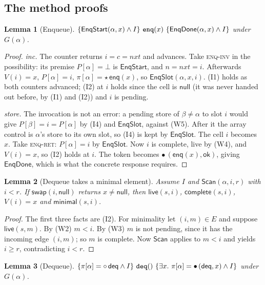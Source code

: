\documentclass[11pt]{article}
\newtheorem{lemma}{Lemma}[section]
\theoremstyle{definition}
\theoremstyle{remark}
\newcommand{\Enq}{\mathsf{enq}}
\newcommand{\Deq}{\mathsf{deq}}
\newcommand{\Swap}{\mathsf{swap}}
\newcommand{\ok}{\mathsf{ok}}
\newcommand{\nul}{\mathsf{null}}
\newcommand{\live}{\mathsf{live}}
\newcommand{\complete}{\mathsf{complete}}
\newcommand{\minimal}{\mathsf{minimal}}
\newcommand{\Scan}{\mathsf{Scan}}
\newcommand{\tokens}{\pi}
\newcommand{\code}[1]{\texttt{\detokenize{#1}}}
\newcommand{\tok}[1]{\circ\,#1}
\newcommand{\done}[2]{\bullet\,(#1,#2)}
\newcommand{\lini}[1]{\star\,#1}
\newcommand{\ms}[1]{\mathsf{#1}}
\begin{document}
\subsection{The method proofs}

\begin{lemma}[Enqueue]\label{lem:enq}
$\{\ms{EnqStart}(\alpha, x) \wedge I\}\ \code{enq}(x)\ \{\ms{EnqDone}(\alpha, x) \wedge I\}$
under $G(\alpha)$.
\end{lemma}

\begin{proof}
\emph{inc.}  The counter returns $i = c = \mathit{nxt}$ and advances.  Take
\textsc{enq-inv} in the possibility: its premise $P[\alpha] = \bot$ is
$\ms{EnqStart}$, and $n = \mathit{nxt} = i$.  Afterwards $V(i) = x$,
$P[\alpha] = i$, $\tokens[\alpha] = \lini{\Enq(x)}$, so $\ms{EnqSlot}(\alpha,
x, i)$.  (I1) holds as both counters advanced; (I2) at $i$ holds since the
cell is $\nul$ (it was never handed out before, by (I1) and (I2)) and $i$ is
pending.

\emph{store.}  The invocation is not an error: a pending store of
$\beta \ne \alpha$ to slot $i$ would give $P[\beta] = i = P[\alpha]$ by
(I4) and $\ms{EnqSlot}$, against (W5).  After it the array control is
$\alpha$'s store to its own slot, so (I4) is kept by $\ms{EnqSlot}$.  The
cell $i$ becomes $x$.  Take \textsc{enq-ret}: $P[\alpha]
= i$ by $\ms{EnqSlot}$.  Now $i$ is complete, live by (W4), and $V(i) = x$,
so (I2) holds at $i$.  The token becomes $\done{\Enq(x)}{\ok}$, giving
$\ms{EnqDone}$, which is what the concrete response requires.
\end{proof}

\begin{lemma}[Dequeue takes a minimal element]\label{lem:minimal}
Assume $I$ and $\Scan(\alpha, i, r)$ with $i < r$.  If $\Swap(i, \nul)$
returns $x \ne \nul$, then $\live(s, i)$, $\complete(s, i)$, $V(i) = x$ and
$\minimal(s, i)$.
\end{lemma}

\begin{proof}
The first three facts are (I2).  For minimality let $(i, m) \in E$ and
suppose $\live(s, m)$.  By (W2) $m < i$.  By (W3) $m$ is not pending, since it
has the incoming edge $(i, m)$; so $m$ is complete.  Now $\Scan$ applies to
$m < i$ and yields $i \ge r$, contradicting $i < r$.
\end{proof}

\begin{lemma}[Dequeue]\label{lem:deq}
$\{\tokens[\alpha] = \tok{\Deq} \wedge I\}\ \code{deq}()\
\{\exists x.\ \tokens[\alpha] = \done{\Deq}{x} \wedge I\}$ under $G(\alpha)$.
\end{lemma}
\end{document}
